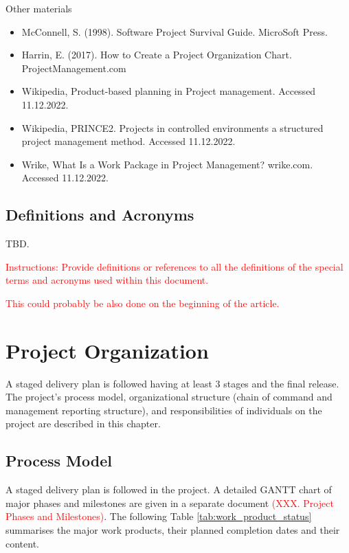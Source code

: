 \documentclass{article}
\begin{document}
Other materials
\begin{itemize}
\item McConnell, S. (1998). Software Project Survival Guide. MicroSoft Press.
\item Harrin, E. (2017). How to Create a Project Organization Chart. ProjectManagement.com
\item Wikipedia, Product-based planning in Project management. Accessed 11.12.2022.
\item Wikipedia, PRINCE2. Projects in controlled environments a structured project management method. Accessed 11.12.2022.
\item Wrike, What Is a Work Package in Project Management? wrike.com. Accessed 11.12.2022.
\end{itemize}

\subsection{Definitions and Acronyms}

TBD.

\textcolor{red}{Instructions: Provide definitions or references to all the definitions of the special terms and acronyms used within this document.}

\textcolor{red}{This could probably be also done on the beginning of the article.}

\section{Project Organization}
A staged delivery plan is followed having at least 3 stages and the final release.
The project’s process model, organizational structure (chain of command and
management reporting structure), and responsibilities of individuals on the project
are described in this chapter.



\subsection{Process Model}
A staged delivery plan is followed in the project. A detailed GANTT chart of major
phases and milestones are given in a separate document \textcolor{red}{(XXX. Project Phases
and Milestones)}. The following Table \ref{tab:work_product_status} summarises the major work products,
their planned completion dates and their content.
\end{document}
